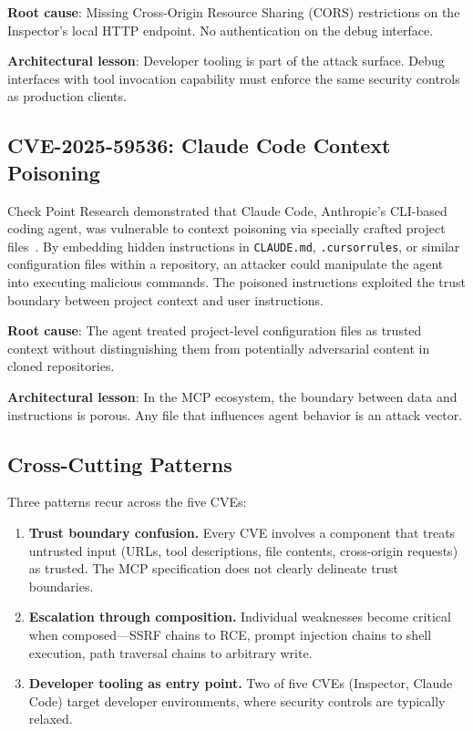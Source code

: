 \documentclass[11pt,twocolumn]{article}
\begin{document}
\textbf{Root cause}: Missing Cross-Origin Resource Sharing (CORS) restrictions on the Inspector's local HTTP endpoint. No authentication on the debug interface.

\textbf{Architectural lesson}: Developer tooling is part of the attack surface. Debug interfaces with tool invocation capability must enforce the same security controls as production clients.

\subsection{CVE-2025-59536: Claude Code Context Poisoning}

Check Point Research demonstrated that Claude Code, Anthropic's CLI-based coding agent, was vulnerable to context poisoning via specially crafted project files~\cite{cve-2025-59536}. By embedding hidden instructions in \texttt{CLAUDE.md}, \texttt{.cursorrules}, or similar configuration files within a repository, an attacker could manipulate the agent into executing malicious commands. The poisoned instructions exploited the trust boundary between project context and user instructions.

\textbf{Root cause}: The agent treated project-level configuration files as trusted context without distinguishing them from potentially adversarial content in cloned repositories.

\textbf{Architectural lesson}: In the MCP ecosystem, the boundary between data and instructions is porous. Any file that influences agent behavior is an attack vector.

\subsection{Cross-Cutting Patterns}

Three patterns recur across the five CVEs:

\begin{enumerate}[leftmargin=*]
    \item \textbf{Trust boundary confusion.} Every CVE involves a component that treats untrusted input (URLs, tool descriptions, file contents, cross-origin requests) as trusted. The MCP specification does not clearly delineate trust boundaries.
    \item \textbf{Escalation through composition.} Individual weaknesses become critical when composed---SSRF chains to RCE, prompt injection chains to shell execution, path traversal chains to arbitrary write.
    \item \textbf{Developer tooling as entry point.} Two of five CVEs (Inspector, Claude Code) target developer environments, where security controls are typically relaxed.
\end{enumerate}
\end{document}
